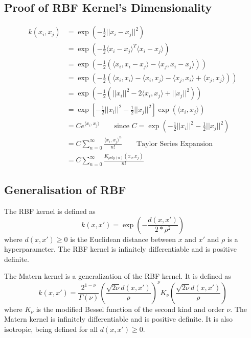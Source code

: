 \documentclass[hidelinks]{book}
\numberwithin{equation}{section}
\begin{document}
\subsection{Proof of RBF Kernel's Dimensionality}

\begin{equation}
\begin{split}
k(x_i, x_j) & = \exp(-\frac{1}{2} ||x_i - x_j||^2) \\
  & = \exp(-\frac{1}{2} \langle x_i - x_j\rangle^T \langle x_i - x_j\rangle) \\
  & = \exp(-\frac{1}{2} (\langle x_i, x_i - x_j\rangle - \langle x_j, x_i - x_j\rangle)) \\
  & = \exp(-\frac{1}{2} (\langle x_i, x_i\rangle - \langle x_i, x_j\rangle - \langle x_j, x_i\rangle + \langle x_j, x_j\rangle)) \\
  & = \exp(-\frac{1}{2} (||x_i||^2 - 2\langle x_i, x_j\rangle + ||x_j||^2)) \\
  & = \exp[-\frac{1}{2} ||x_i||^2 - \frac{1}{2} ||x_j||^2] \exp(\langle x_i, x_j\rangle) \\
  & = C e^{\langle x_i, x_j\rangle} \quad \quad \text{since } C = \exp(-\frac{1}{2} ||x_i||^2 - \frac{1}{2} ||x_j||^2) \\
  & = C \sum_{n=0}^{\infty} \frac{\langle x_i, x_j\rangle^n}{n!} \quad \quad \text{Taylor Series Expansion} \\
  & = C \sum_{n=0}^{\infty} \frac{K_{poly(n)}(x_i, x_j) }{n!}
\end{split}
\end{equation}

\subsection{Generalisation of RBF}
The RBF kernel is defined as
 $$ k(x,x') = \exp\left(-\frac{d(x,x')}{2*\rho^2}\right) $$
where $d(x,x') \geq 0$ is the Euclidean distance between $x$ and $x'$ and
$\rho$ is a hyperparameter. The RBF kernel is infinitely differentiable and
is positive definite.

The Matern kernel is a generalization of the RBF kernel. It is defined as
$$ k(x,x') = \frac{2^{1-\nu}}{\Gamma(\nu)}\left(\frac{\sqrt{2\nu}d(x,x')}{\rho}\right)^\nu K_{\nu}\left(\frac{\sqrt{2\nu}d(x,x')}{\rho}\right) $$
where $K_{\nu}$ is the modified Bessel function of the second kind and
order $\nu$. The Matern kernel is infinitely differentiable and is positive definite.
It is also isotropic, being defined for all $d(x,x') \geq 0$.
\end{document}
